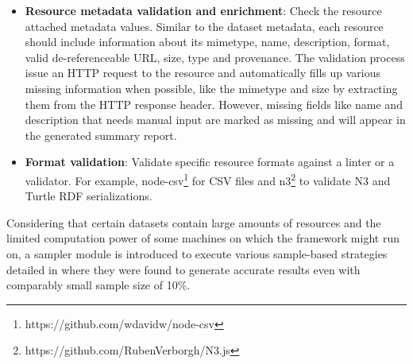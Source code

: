 \documentclass[runningheads,a4paper]{llncs}
\begin{document}
\begin{itemize}
  \item \textbf{Resource metadata validation and enrichment}: Check the resource attached metadata values. Similar to the dataset metadata, each resource should include information about its mimetype, name, description, format, valid de-referenceable URL, size, type and provenance. The validation process issue an HTTP request to the resource and automatically fills up various missing information when possible, like the mimetype and size by extracting them from the HTTP response header. However, missing fields like name and description that needs manual input are marked as missing and will appear in the generated summary report.
  \item \textbf{Format validation}: Validate specific resource formats against a linter or a validator. For example, node-csv\footnote{https://github.com/wdavidw/node-csv} for CSV files and n3\footnote{https://github.com/RubenVerborgh/N3.js} to validate N3 and Turtle RDF serializations.
\end{itemize}

Considering that certain datasets contain large amounts of resources and the limited computation power of some machines on which the framework might run on, a sampler module is introduced to execute various sample-based strategies detailed in \cite{scalableApproach} where they were found to generate accurate results even with comparably small sample size of 10\%.


\end{document}
